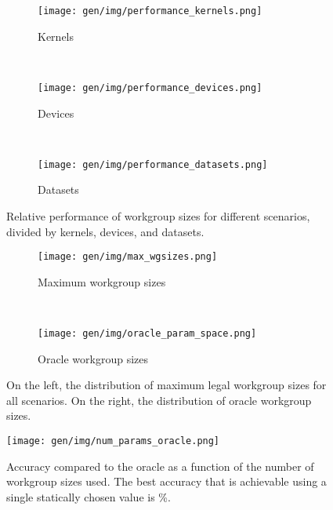 \begin{figure}
\begin{subfigure}[t]{0.32\textwidth}
\centering
\texttt{[image: gen/img/performance\_kernels.png]}
\vspace{-1.5em} %
\caption{Kernels}
\label{fig:performance-kernels}
\end{subfigure}
~%
\begin{subfigure}[t]{0.32\textwidth}
\centering
\texttt{[image: gen/img/performance\_devices.png]}
\vspace{-1.5em} %
\caption{Devices}
\label{fig:performance-devices}
\end{subfigure}
~%
\begin{subfigure}[t]{0.32\textwidth}
\centering
\texttt{[image: gen/img/performance\_datasets.png]}
\vspace{-1.5em} %
\caption{Datasets}
\label{fig:performance-datasets}
\end{subfigure}
\label{fig:performance}
\caption{%
  Relative performance of workgroup sizes for different
  scenarios, divided by kernels, devices, and datasets.%
}
\end{figure}


\begin{figure}
\begin{subfigure}[t]{0.45\textwidth}
\centering
\texttt{[image: gen/img/max\_wgsizes.png]}
\vspace{-1.5em} %
\caption{Maximum workgroup sizes}
\label{fig:max-wgsizes}
\end{subfigure}
~%
\begin{subfigure}[t]{0.45\textwidth}
\centering
\texttt{[image: gen/img/oracle\_param\_space.png]}
\vspace{-1.5em} %
\caption{Oracle workgroup sizes}
\label{fig:oracle-wgsizes}
\end{subfigure}
\caption{%
  On the left, the distribution of maximum legal workgroup sizes for
  all scenarios. On the right, the distribution of oracle workgroup
  sizes.%
}
\label{fig:heatmaps}
\end{figure}


\begin{figure}
\centering
\texttt{[image: gen/img/num\_params\_oracle.png]}
\caption{%
  Accuracy compared to the oracle as a function of the number of
  workgroup sizes used. The best accuracy that is achievable using a
  single statically chosen value is
  \protect\%.%
}
\label{fig:oracle-accuracy}
\end{figure}

